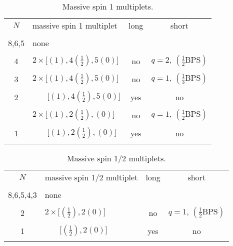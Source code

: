 \documentclass[a4paper,12pt]{article}
\begin{document}
\begin{table}[p]
\begin{center}
\begin{tabular} {|c|l|c|c|}
\cline{1-4}  $N$& massive spin 1 multiplet& long  &short
\\ \cline{1-4}&&&\\
8,6,5&none&&\\&&&\\ 4&$2\times\bigl[(1),4(\frac{1}{2}),
5(0)\bigr]$&no&$q=2,\,(\frac{1}{2}\mathrm{BPS})$\\&&& \\
3&$2\times\bigl[(1),4(\frac{1}{2}),
5(0)\bigr]$&no&$q=1,\,(\frac{1}{3}\mathrm{BPS})$\\&&&\\
2&$\quad\;\;\;\bigl[(1),4(\frac{1}{2}), 5(0)\bigr]$&yes&no\\&&&\\
&$2\times\bigl[(1),2(\frac{1}{2}),
(0)\bigr]$&no&$q=1,\,(\frac{1}{2}\mathrm{BPS})$\\&&&\\
1&$\quad\;\;\;\bigl[(1),2(\frac{1}{2}),
(0)\bigr]$&yes&no\\&&&\\\cline{1-4}
\end{tabular}
\caption{Massive spin 1 multiplets.}\label{spin1}

\end{center}
\end{table}

\begin{table}[p]
\begin{center}
\begin{tabular} {|c|l|c|c|}
\cline{1-4}  $N$& massive spin 1/2 multiplet& long  &short
\\ \cline{1-4}&&&\\
8,6,5,4,3&none&&\\&&&\\ 2&$2\times\bigl[(\frac{1}{2}),
2(0)\bigr]$&no&$q=1,\,(\frac{1}{2}\mathrm{BPS})$\\&&& \\
1&$\quad\;\;\;\bigl[(\frac{1}{2}),
2(0)\bigr]$&yes&no\\&&&\\\cline{1-4}
\end{tabular}
\caption{Massive spin 1/2 multiplets.}\label{spin1/2}
\end{center}
\end{table}
\end{document}
